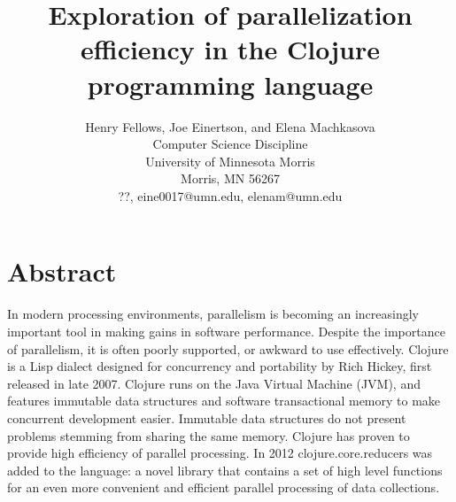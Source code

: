 \documentclass[12pt]{article}
\newcommand{\comment}[1]{{\bf \tt  {#1}}}
\begin{document}
\pagestyle{plain}
%




\title{Exploration of parallelization efficiency in the Clojure programming language}
%
%




\author{
Henry Fellows, Joe Einertson, and Elena Machkasova \\
Computer Science Discipline \\
University of Minnesota Morris\\
Morris, MN 56267\\
??, eine0017@umn.edu, elenam@umn.edu
}




\date{}




\maketitle
\thispagestyle{empty}


\section*{\centering Abstract}
In modern processing environments, parallelism is becoming an increasingly important tool in making gains in software performance. Despite the importance of parallelism, it is often poorly supported, or awkward to use effectively.
Clojure is a Lisp dialect designed for concurrency and portability by Rich Hickey, first released in late 2007. Clojure runs on the Java Virtual Machine (JVM), and features immutable data structures and software transactional memory to make concurrent development easier. Immutable data structures do not present problems stemming from sharing the same memory. Clojure has proven to provide high efficiency of parallel processing. In 2012 clojure.core.reducers was added to the language: a novel library that contains a set of high level functions for an even more convenient and efficient parallel processing of data collections. 
\end{document}
